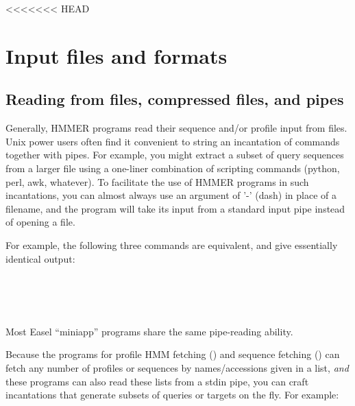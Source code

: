 <<<<<<< HEAD
\chapter{Input files and formats}
\label{chapter:formats}
\setcounter{footnote}{0}

\section{Reading from files, compressed files, and pipes}

Generally, HMMER programs read their sequence and/or profile input
from files. Unix power users often find it convenient to string an
incantation of commands together with pipes. For example, you might
extract a subset of query sequences from a larger file using a
one-liner combination of scripting commands (python, perl, awk,
whatever). To facilitate the use of HMMER programs in such
incantations, you can almost always use an argument of '-' (dash) in
place of a filename, and the program will take its input from a
standard input pipe instead of opening a file.

For example, the following three commands are equivalent, and give
essentially identical output:

   \vspace{1ex}
     \\
    \\
    \\
   \vspace{1ex}

Most Easel ``miniapp'' programs share the same pipe-reading ability.

Because the programs for profile HMM fetching () and
sequence fetching () can fetch any number of profiles
or sequences by names/accessions given in a list, \emph{and} these
programs can also read these lists from a stdin pipe, you can craft
incantations that generate subsets of queries or targets on the
fly. For example:

   \vspace{1ex}
   \begin{fullwidth}
    \\
    \\
   \end{fullwidth}
   \vspace{1ex}

